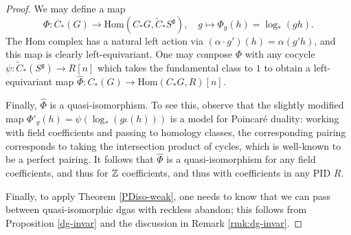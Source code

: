 \documentclass{memo-l}
\theoremstyle{definition}
\theoremstyle{remark}
\numberwithin{section}{chapter}
\numberwithin{equation}{chapter}
\begin{document}
\begin{proof}
We may define a map $$\Phi: C_*(G) \to \text{Hom}(C_* G, \tilde C_* S^{\mathfrak g}), \quad g \mapsto \Phi_g(h) = \log_*(gh).$$ The Hom complex has a natural left action via $(\alpha \cdot g')(h) = \alpha(g'h)$, and this map is clearly left-equivariant. One may compose $\Phi$ with any cocycle $\psi: \tilde C_*(S^{\mathfrak g}) \to R[n]$ which takes the fundamental class to $1$ to obtain a left-equivariant map $\hat \Phi: C_*(G) \to \text{Hom}(C_* G, R)[n]$. 

Finally, $\hat \Phi$ is a quasi-isomorphism. To see this, observe that the slightly modified map $\Phi'_g(h) = \psi\left(\log_*(g\iota(h))\right)$ is a model for Poincar\'e duality: working with field coefficients and passing to homology classes, the corresponding pairing corresponds to taking the intersection product of cycles, which is well-known to be a perfect pairing. It follows that $\hat \Phi$ is a quasi-isomorphism for any field coefficients, and thus for $\Bbb Z$ coefficients, and thus with coefficients in any PID $R$. 

Finally, to apply Theorem \ref{PDiso-weak}, one needs to know that we can pass between quasi-isomorphic dgas with reckless abandon; this follows from Proposition \ref{dg-invar} and the discussion in Remark \ref{rmk:dg-invar}.
\end{proof}
\end{document}
